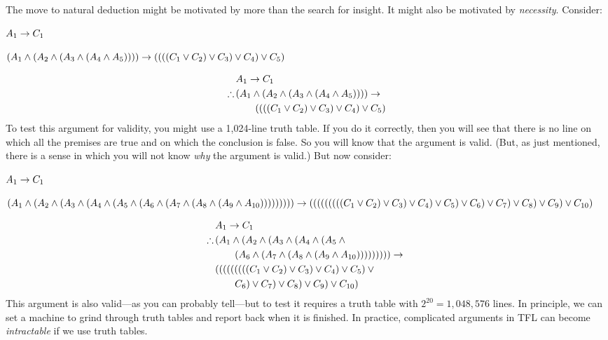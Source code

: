 The move to natural deduction might be motivated by more than the search for insight. It might also be motivated by \emph{necessity}. Consider:
\ifHTMLtarget
\begin{earg}
	\item $A_1 \rightarrow C_1$
	\item[\texttherefore] $(A_1 \wedge (A_2 \wedge (A_3 \wedge (A_4 \wedge A_5)))) \rightarrow 
	((((C_1 \vee C_2) \vee C_3) \vee C_4) \vee C_5)$
\end{earg}
\else
\begin{align*}
	& A_1 \eif C_1 \\
	\therefore\, & (A_1 \eand (A_2 \eand (A_3 \eand (A_4 \eand A_5)))) \eif {}\\ 
	& \qquad ((((C_1 \eor C_2) \eor C_3) \eor C_4) \eor C_5)
\end{align*}
\fi
To test this argument for validity, you might use a 1{,}024-line truth table. If you do it correctly, then you will see that there is no line on which all the premises are true and on which the conclusion is false. So you will know that the argument is valid. (But, as just mentioned, there is a sense in which you will not know \emph{why} the argument is valid.) But now consider:
\ifHTMLtarget
\begin{earg}
\item $A_1 \rightarrow C_1$
\item[\texttherefore] $(A_1 \wedge (A_2 \wedge (A_3 \wedge (A_4 \wedge (A_5 \wedge 
 (A_6 \wedge (A_7 \wedge (A_8 \wedge (A_9 \wedge A_{10}))))))))) \rightarrow 
 (((((((((C_1 \vee C_2) \vee C_3) \vee C_4) \vee C_5) \vee  C_6) \vee
 C_7) \vee C_8) \vee C_9) \vee C_{10})$
\end{earg}
\else
\begin{align*}
& A_1 \eif C_1 \\
\therefore\, & \small (A_1 \eand (A_2 \eand (A_3 \eand (A_4 \eand (A_5 \eand {}\\
&\qquad (A_6 \eand (A_7 \eand (A_8 \eand (A_9 \eand A_{10}))))))))) \eif {}\\
&(((((((((C_1 \eor C_2) \eor C_3) \eor C_4) \eor C_5) \eor {}\\
& \qquad C_6) \eor C_7) \eor C_8) \eor C_9) \eor C_{10})
\end{align*}
\fi
This argument is also valid---as you can probably tell---but to test it requires a truth table with $2^{20} = 1{,}048{,}576$ lines. In principle, we can set a machine to grind through truth tables and report back when it is finished. In practice, complicated arguments in TFL can become \emph{intractable} if we use truth tables.

